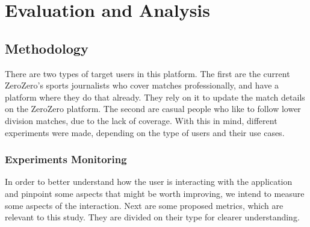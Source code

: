 \chapter{Evaluation and Analysis}\label{chap:evaluation-and-analysis}

\section{Methodology}\label{sec:prob-methodology}

There are two types of target users in this platform. The first are the current ZeroZero's sports journalists who cover matches professionally, and have a platform where they do that already. They rely on it to update the match details on the ZeroZero platform. The second are casual people who like to follow lower division matches, due to the lack of coverage. With this in mind, different experiments were made, depending on the type of users and their use cases.

\subsection{Experiments Monitoring}

In order to better understand how the user is interacting with the application and pinpoint some aspects that might be worth improving, we intend to measure some aspects of the interaction. Next are some proposed metrics, which are relevant to this study. They are divided on their type for clearer understanding.

